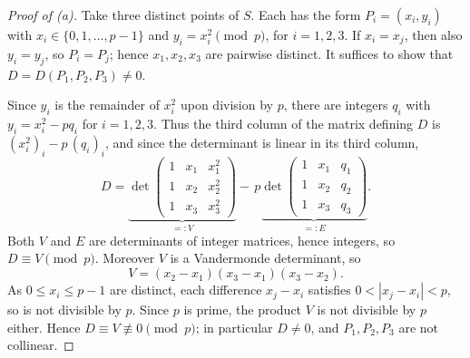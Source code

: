 \documentclass[a4paper,12pt]{article}
\newcommand{\card}[1]{\left| #1 \right|}
\begin{document}
\begin{proof}[Proof of (a)]
	Take three distinct points of $S$. Each has the form $P_i = (x_i, y_i)$ with $x_i \in \{0, 1, \hdots, p-1\}$ and $y_i = x_i^2 \pmod p$, for $i = 1, 2, 3$. If $x_i = x_j$, then also $y_i = y_j$, so $P_i = P_j$; hence $x_1, x_2, x_3$ are pairwise distinct. It suffices to show that $D = D(P_1, P_2, P_3) \neq 0$.

	Since $y_i$ is the remainder of $x_i^2$ upon division by $p$, there are integers $q_i$ with $y_i = x_i^2 - p q_i$ for $i = 1, 2, 3$. Thus the third column of the matrix defining $D$ is $(x_i^2)_i - p\,(q_i)_i$, and since the determinant is linear in its third column,
	\[
		D = \underbrace{\det \begin{pmatrix} 1 & x_1 & x_1^2 \\ 1 & x_2 & x_2^2 \\ 1 & x_3 & x_3^2 \end{pmatrix}}_{=: V} - \, p \underbrace{\det \begin{pmatrix} 1 & x_1 & q_1 \\ 1 & x_2 & q_2 \\ 1 & x_3 & q_3 \end{pmatrix}}_{=: E}.
	\]
	Both $V$ and $E$ are determinants of integer matrices, hence integers, so $D \equiv V \pmod p$. Moreover $V$ is a Vandermonde determinant, so
	\[
		V = (x_2 - x_1)(x_3 - x_1)(x_3 - x_2).
	\]
	As $0 \le x_i \le p-1$ are distinct, each difference $x_j - x_i$ satisfies $0 < \card{x_j - x_i} < p$, so is not divisible by $p$. Since $p$ is prime, the product $V$ is not divisible by $p$ either. Hence $D \equiv V \not\equiv 0 \pmod p$; in particular $D \neq 0$, and $P_1, P_2, P_3$ are not collinear.
\end{proof}
\end{document}
